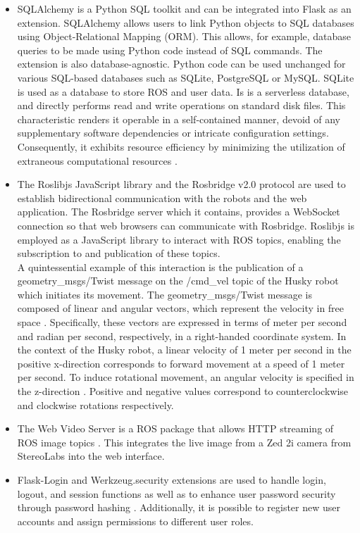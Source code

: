 \documentclass[conference]{IEEEtran}
\begin{document}
\begin{itemize}
\item SQLAlchemy is a Python SQL toolkit and can be integrated into Flask as an extension. SQLAlchemy allows users to link Python objects to SQL databases using Object-Relational Mapping (ORM). This allows, for example, database queries to be made using Python code instead of SQL commands. The extension is also database-agnostic. 
Python code can be used unchanged for various SQL-based databases such as SQLite, PostgreSQL or MySQL. \cite{sqlalchemy} 
SQLite is used as a database to store ROS and user data. Is is a serverless database, and directly performs read and write operations on standard disk files. This characteristic renders it operable in a self-contained manner, devoid of any supplementary software dependencies or intricate configuration settings. Consequently, it exhibits resource efficiency by minimizing the utilization of extraneous computational resources \cite{sqlite}.
\item The Roslibjs JavaScript library and the Rosbridge v2.0 protocol are used to establish bidirectional communication with the robots and the web application. The Rosbridge server which it contains, provides a WebSocket connection so that web browsers can communicate with Rosbridge.
Roslibjs is employed as a JavaScript library to interact with ROS topics, enabling the subscription to and publication of these topics. \cite{rosbridgeOkState} \cite{rosbridgeSuite}\\ A quintessential example of this interaction is the publication of a geometry\_msgs/Twist message on the /cmd\_vel topic of the Husky robot which initiates its movement.
The geometry\_msgs/Twist message is composed of linear and angular vectors, which represent the velocity in free space \cite{twistmsg}. Specifically, these vectors are expressed in terms of meter per second and radian per second, respectively, in a right-handed coordinate system.
In the context of the Husky robot, a linear velocity of 1 meter per second in the positive x-direction corresponds to forward movement at a speed of 1 meter per second. To induce rotational movement, an angular velocity is specified in the z-direction \cite{huskydriving}. Positive and negative values correspond to counterclockwise and clockwise rotations respectively.
\item The Web Video Server is a ROS package that allows HTTP streaming of ROS image topics \cite{webvideoserver}. This integrates the live image from a Zed 2i camera from StereoLabs \cite{zed} into the web interface.
\item Flask-Login and Werkzeug.security extensions are used to handle login, logout, and session functions as well as to enhance user password security through password hashing \cite{flasklogin} \cite{werkzeug}. Additionally, it is possible to register new user accounts and assign permissions to different user roles. 
\end{itemize}
\end{document}
